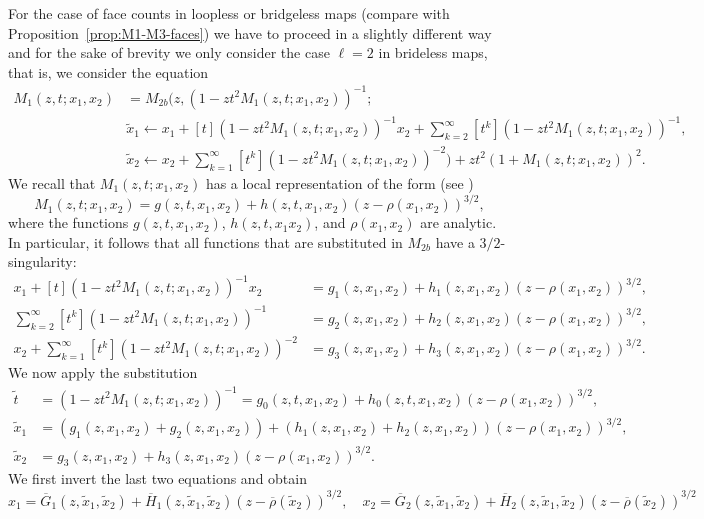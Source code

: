 \documentclass[a4paper,UKenglish,cleveref, autoref, thm-restate]{lipics-v2021}
\renewcommand{\(}{\left(}
\renewcommand{\)}{\right)}
\begin{document}
For the case of face counts in loopless or bridgeless maps   
(compare with Proposition~\ref{prop:M1-M3-faces})
we have to proceed in a slightly different way and for the sake of brevity
we only consider the case $\ell = 2$ in brideless maps, that is, we consider the equation
\begin{align*}
{M_1}(z,t;x_1,x_2) 
&= {M_{2b}}\Biggl( z, (1-zt^2{M_1}(z,t;x_1,x_2))^{-1}; \\
& \tilde  x_1 \leftarrow 
x_1 + [t](1-zt^2{M_1}(z,t;x_1,x_2))^{-1} x_2  +\sum_{k=2}^{\infty} [t^k] (1-zt^2{M_1}(z,t;x_1,x_2))^{-1}, \\
&  \tilde x_2 \leftarrow 
x_2 + \sum_{k=1}^{\infty} [t^k] (1-zt^2{M_1}(z,t;x_1,x_2))^{-2} \biggr)
+ zt^2(1+{M_1}(z,t;x_1,x_2))^2 .   
\end{align*}
We recall that ${M_1}(z,t;x_1,x_2)$ has a local representation of the form
(see \cite{CDK19})
\[
{M_1}(z,t;x_1,x_2) = g(z,t,x_1,x_2) + h(z,t,x_1,x_2) (z- \rho(x_1,x_2))^{3/2},
\]
where the functions $g(z,t,x_1,x_2)$, $h(z,t,x_1x_2)$, and $\rho(x_1,x_2)$ are analytic. 
In particular, it follows that all functions that are substituted in $M_{2b}$ have a
$3/2$-singularity:
\begin{align*}
    x_1 + [t](1-zt^2{M_1}(z,t;x_1,x_2))^{-1} x_2 &= g_1(z, x_1,x_2)+ h_1(z,x_1,x_2) (z- \rho(x_1,x_2))^{3/2}, \\
    \sum_{k=2}^{\infty} [t^k] (1-zt^2{M_1}(z,t;x_1,x_2))^{-1} &= 
    g_2(z, x_1,x_2)+ h_2(z,x_1,x_2) (z- \rho(x_1,x_2))^{3/2}, \\
    x_2 +\sum_{k=1}^{\infty} [t^k] (1-zt^2{M_1}(z,t;x_1,x_2))^{-2}  &= g_3(z, x_1,x_2)+ h_3(z,x_1,x_2) (z- \rho(x_1,x_2))^{3/2}.
\end{align*}
We now apply the substitution 
\begin{align*}
\tilde t &= (1-zt^2{M_1}(z,t;x_1,x_2))^{-1} = g_0(z,t,x_1,x_2) + h_0(z,t,x_1,x_2) (z- \rho(x_1,x_2))^{3/2}, \\
\tilde x_1 &= (g_1(z, x_1,x_2)+g_2(z,x_1,x_2))+ (h_1(z,x_1,x_2)+h_2(z,x_1,x_2)) (z- \rho(x_1,x_2))^{3/2}, \\
\tilde x_2 &= g_3(z, x_1,x_2)+ h_3(z,x_1,x_2) (z- \rho(x_1,x_2))^{3/2}.
\end{align*}
We first invert the last two equations and obtain
\begin{equation}
\label{eqx2tildex2}
x_1 = \overline G_1(z,\tilde x_1,\tilde x_2) + \overline H_1(z,\tilde x_1, \tilde x_2) 
(z- \overline \rho(\tilde x_2))^{3/2}, \quad
x_2 = \overline G_2(z,\tilde x_1,\tilde x_2) + \overline H_2(z,\tilde x_1, \tilde x_2) 
(z- \overline \rho(\tilde x_2))^{3/2}
\end{equation}
\end{document}
